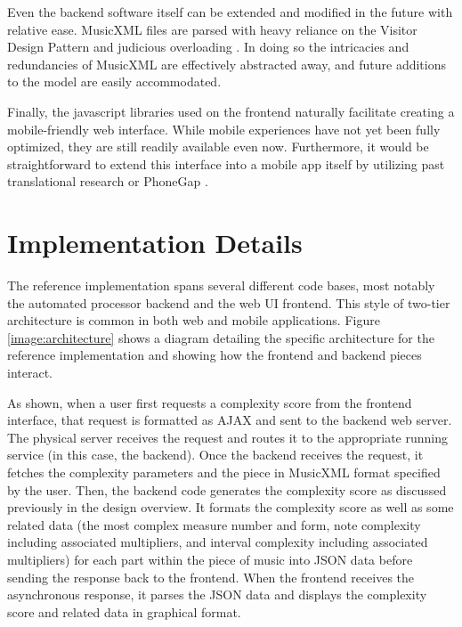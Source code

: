 \documentclass[12pt]{report}
\begin{document}
Even the backend software itself can be extended and modified in the future with relative ease. MusicXML files are parsed with heavy reliance on the Visitor Design Pattern \cite{gamma1994design} and judicious overloading \cite{bloch2008effective}. In doing so the intricacies and redundancies of MusicXML are effectively abstracted away, and future additions to the model are easily accommodated.

Finally, the javascript libraries used on the frontend naturally facilitate creating a mobile-friendly web interface. While mobile experiences have not yet been fully optimized, they are still readily available even now. Furthermore, it would be straightforward to extend this interface into a mobile app itself by utilizing past translational research \cite{holder2013cloudSPLASH} \cite{holder2013cloudASE} or PhoneGap \cite{phonegapBook} \cite{phonegapArticle}.



\section{Implementation Details} 
\label{sec:details}

The reference implementation spans several different code bases, most notably the automated processor backend and the web UI frontend. This style of two-tier architecture is common in both web and mobile applications. Figure \ref{image:architecture} shows a diagram detailing the specific architecture for the reference implementation and showing how the frontend and backend pieces interact.

As shown, when a user first requests a complexity score from the frontend interface, that request is formatted as AJAX \cite{garrett2005ajax} and sent to the backend web server. The physical server receives the request and routes it to the appropriate running service (in this case, the backend). Once the backend receives the request, it fetches the complexity parameters and the piece in MusicXML format specified by the user. Then, the backend code generates the complexity score as discussed previously in the design overview. It formats the complexity score as well as some related data (the most complex measure number and form, note complexity including associated multipliers, and interval complexity including associated multipliers) for each part within the piece of music into JSON \cite{crockford2006application} data before sending the response back to the frontend. When the frontend receives the asynchronous response, it parses the JSON data and displays the complexity score and related data in graphical format.
\end{document}
